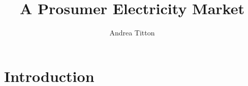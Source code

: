 \documentclass[american]{scrartcl}
\title{A Prosumer Electricity Market}
\author{Andrea Titton}
\begin{document}
\maketitle

\section{Introduction}



\iffalse
    \section{Model}

    

    \section{Examples}

    

\fi

\newpage
{} %
\printbibliography
\end{document}
